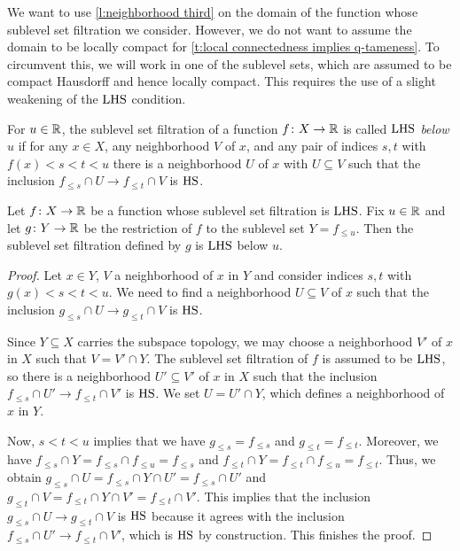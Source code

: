 We want to use \cref{l:neighborhood third} on the domain of the function whose sublevel set filtration we consider.
However, we do not want to assume the domain to be locally compact for \cref{t:local connectedness implies q-tameness}.
To circumvent this, we will work in one of the sublevel sets, which are assumed to be compact Hausdorff and hence locally compact.
This requires the use of a slight weakening of the $\mathrm{LHS}$ condition.

\begin{defi}
	For $u \in \mathbb{R}$, the sublevel set filtration of a function $f \colon X \to \mathbb{R}$ is called \emph{$\mathrm{LHS}$ below $u$} if for any $x \in X$, any neighborhood $V$ of $x$, and any pair of indices $s,t$ with $f(x) < s < t < u$ there is a neighborhood $U$ of $x$ with $U \subseteq V$ such that the inclusion $f_{\leq s} \cap U \to f_{\leq t} \cap V$ is $\mathrm{HS}$.
\end{defi}

\begin{lem} \label{l:restriction of LHS filtration}
	Let $f \colon X \to \mathbb{R}$ be a function whose sublevel set filtration is $\mathrm{LHS}$.
	Fix $u \in \mathbb{R}$ and let $g \colon Y \to \mathbb{R}$ be the restriction of $f$ to the sublevel set $Y = f_{\leq u}$.
	Then the sublevel set filtration defined by $g$ is $\mathrm{LHS}$ below $u$.
\end{lem}

\begin{proof}
	Let $x \in Y$, $V$ a neighborhood of $x$ in $Y$ and consider indices $s,t$ with $g(x) < s < t < u$.
	We need to find a neighborhood $U \subseteq V$ of $x$ such that the inclusion $g_{\leq s} \cap U \to g_{\leq t} \cap V$ is $\mathrm{HS}$.

	Since $Y \subseteq X$ carries the subspace topology, we may choose a neighborhood $V'$ of $x$ in $X$ such that $V = V' \cap Y$.
	The sublevel set filtration of $f$ is assumed to be $\mathrm{LHS}$, so there is a neighborhood $U' \subseteq V'$ of $x$ in $X$ such that the inclusion $f_{\leq s} \cap U' \to f_{\leq t} \cap V'$ is $\mathrm{HS}$.
	We set $U = U' \cap Y$, which defines a neighborhood of $x$ in $Y$.

	Now, $s < t < u$ implies that we have $g_{\leq s} = f_{\leq s}$ and $g_{\leq t} = f_{\leq t}$.
	Moreover, we have $f_{\leq s} \cap Y = f_{\leq s} \cap f_{\leq u} = f_{\leq s}$ and $f_{\leq t} \cap Y = f_{\leq t} \cap f_{\leq u} = f_{\leq t}$.
	Thus, we obtain $g_{\leq s} \cap U = f_{\leq s} \cap Y \cap U' = f_{\leq s} \cap U'$ and $g_{\leq t} \cap V = f_{\leq t} \cap Y \cap V' = f_{\leq t} \cap V'$.
	This implies that the inclusion $g_{\leq s} \cap U \to g_{\leq t} \cap V$ is $\mathrm{HS}$ because it agrees with the inclusion $f_{\leq s} \cap U' \to f_{\leq t} \cap V'$, which is $\mathrm{HS}$ by construction.
	This finishes the proof.
\end{proof}

